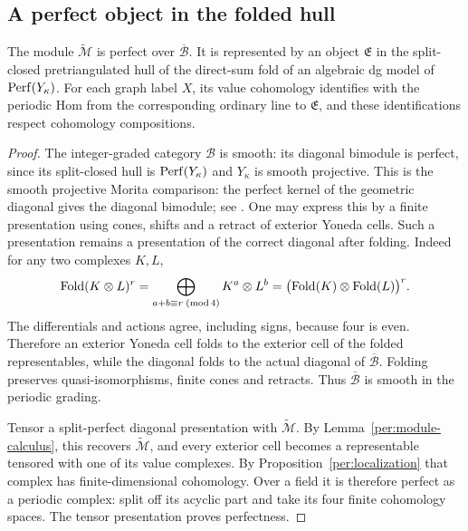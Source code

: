 \subsection{A perfect object in the folded hull}

\begin{proposition}
\label{per:perfect}
The module $\widetilde{\mathcal M}$ is perfect over
$\overline{\mathcal B}$.  It is represented by an object
$\mathfrak E$ in the split-closed pretriangulated hull of the
direct-sum fold of an algebraic dg model of $\operatorname{Perf}(Y_\kappa)$.  For
each graph label $X$, its value cohomology identifies with the
periodic Hom from the corresponding ordinary line to $\mathfrak E$,
and these identifications respect cohomology compositions.
\end{proposition}

\begin{proof}
The integer-graded category $\mathcal B$ is smooth: its diagonal
bimodule is perfect, since its split-closed hull is
$\operatorname{Perf}(Y_\kappa)$ and $Y_\kappa$ is smooth projective.  This is the
smooth projective Morita comparison: the perfect kernel of the
geometric diagonal gives the diagonal bimodule; see
\cite{toen-vaquie}.  One may express
this by a finite presentation using cones, shifts and a retract of
exterior Yoneda cells.  Such a presentation remains a presentation of
the correct diagonal after folding.  Indeed for any two complexes
$K,L$,
\[
 \operatorname{Fold}(K\otimes L)^r
   =\bigoplus_{a+b\equiv r\;({\rm mod}\,4)}K^a\otimes L^b
   =\bigl(\operatorname{Fold}(K)\otimes
                      \operatorname{Fold}(L)\bigr)^r.
\]
The differentials and actions agree, including signs, because four
is even.  Therefore an exterior Yoneda cell folds to the exterior
cell of the folded representables, while the diagonal folds to the
actual diagonal of $\overline{\mathcal B}$.  Folding preserves
quasi-isomorphisms, finite cones and retracts.  Thus
$\overline{\mathcal B}$ is smooth in the periodic grading.

Tensor a split-perfect diagonal presentation with
$\widetilde{\mathcal M}$.  By Lemma~\ref{per:module-calculus}, this
recovers $\widetilde{\mathcal M}$, and every exterior cell becomes a
representable tensored with one of its value complexes.  By
Proposition~\ref{per:localization} that complex has finite-dimensional
cohomology.  Over a field it is therefore perfect as a periodic
complex: split off its acyclic part and take its four finite
cohomology spaces.  The tensor presentation proves perfectness.


\end{proof}
